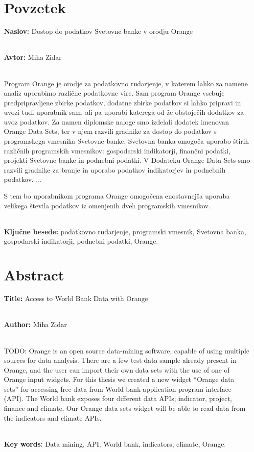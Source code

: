 \chapter*{Povzetek}


\textbf{Naslov:} Dostop do podatkov Svetovne banke v orodju Orange

\ \\
\textbf{Avtor:} Miha Zidar

\ \\
Program Orange je orodje za podatkovno rudarjenje, v katerem
lahko za namene analiz uporabimo različne podatkovne vire. Sam program Orange
vsebuje predpripravljene zbirke podatkov, dodatne zbirke podatkov si lahko 
pripravi in uvozi tudi uporabnik sam, ali pa uporabi katerega od že obstoječih
dodatkov za uvoz podatkov. Za namen diplomske naloge smo izdelali dodatek imenovan
Orange Data Sets, ter v njem razvili gradnike za dostop do podatkov s programskega 
vmesnika Svetovne banke. Svetovna banka omogoča uporabo štirih 
različnih programskih vmesnikov: gospodarski indikatorji, finančni podatki,
projekti Svetovne banke in podnebni podatki. V Dodateku Orange Data Sets smo
razvili gradnike za branje in uporabo podatkov indikatorjev 
in podnebnih podatkov.
...

S tem bo uporabnikom programa Orange omogočena enostavnejša uporaba velikega števila
podatkov iz omenjenih dveh programskih vmesnikov.

\ \\
\textbf{Ključne besede:} podatkovno rudarjenje, programski vmesnik, 
Svetovna banka, gospodarski indikatorji, podnebni podatki, Orange. 




\clearemptydoublepage

\chapter*{Abstract}


\textbf{Title:} Access to World Bank Data with Orange

\ \\
\textbf{Author:} Miha Zidar

\ \\
TODO: Orange is an open source data-mining software, capable of using multiple
sources for data analysis. There are a few test data sample already present
in Orange, and the user can import their own data sets with the use of one of
Orange input widgets. For this thesis we created a new widget ``Orange data sets''
for accessing free data from World bank application program interface (API).
The World bank exposes four different data APIs; indicator, project, finance
and climate. Our Orange data sets widget will be able to read data from the
indicators and climate APIs.


\ \\
\textbf{Key words:} Data mining, API, World bank, indicators, climate, Orange.

